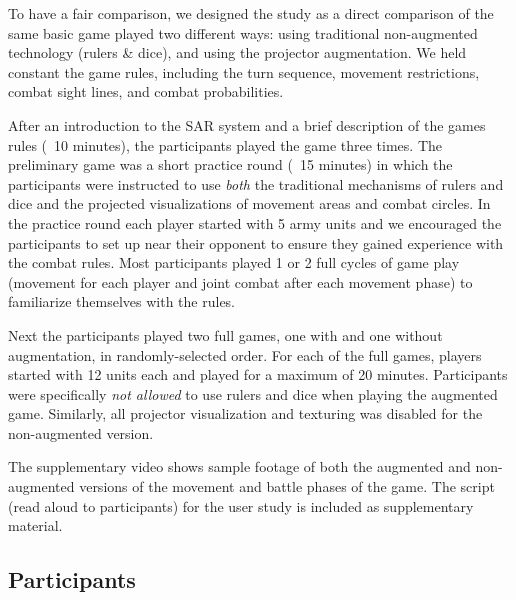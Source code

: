 \documentclass[review]{vgtc}                 %
\begin{document}
To have a fair comparison, we designed the study as a direct
comparison of the same basic game played two different ways: using
traditional non-augmented technology (rulers \& dice), and using
the projector augmentation.  We held constant the game rules, including the
turn sequence, movement restrictions, combat sight lines, and combat
probabilities.

After an introduction to the SAR system and a brief description of the
games rules (~10 minutes), the participants played the
game three times.  The preliminary game was a short practice round
(~15 minutes) in which the participants were instructed
to use {\em both} the traditional mechanisms of rulers and dice and
the projected visualizations of movement areas and combat circles.  In
the practice round each player started with 5 army units and we
encouraged the participants to set up near their opponent to ensure
they gained experience with the combat rules.  Most participants
played 1 or 2 full cycles of game play (movement for each player and
joint combat after each movement phase) to familiarize themselves with
the rules.

Next the participants played two full games, one with and one without
augmentation, in randomly-selected order.  For each of the full games, players started with 12 units each and played for a maximum of 20
minutes.  Participants were specifically {\em not allowed} to use
rulers and dice when playing the augmented game.  Similarly, all
projector visualization and texturing was disabled for the
non-augmented version.

The supplementary video shows sample footage of both the augmented and
non-augmented versions of the movement and battle phases of the game.  
The script (read aloud to
participants) for the user study is included as supplementary
material.

\subsection{Participants}
\end{document}
